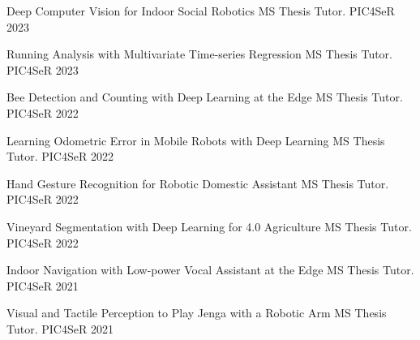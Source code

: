 


\begin{cvhonors}

  \cvhonor
    {Deep Computer Vision for Indoor Social Robotics} %
    {MS Thesis Tutor.} %
    {PIC4SeR} %
    {2023} %

  \cvhonor
    {Running Analysis with Multivariate Time-series Regression}
    {MS Thesis Tutor.} %
    {PIC4SeR} %
    {2023} %

  \cvhonor
    {Bee Detection and Counting with Deep Learning at the Edge} %
    {MS Thesis Tutor.} %
    {PIC4SeR} %
    {2022} %

  \cvhonor
    {Learning Odometric Error in Mobile Robots with Deep Learning}
    {MS Thesis Tutor.} %
    {PIC4SeR} %
    {2022} %

  \cvhonor
    {Hand Gesture Recognition for Robotic Domestic Assistant}
    {MS Thesis Tutor.} %
    {PIC4SeR} %
    {2022} %

  \cvhonor
    {Vineyard Segmentation with Deep Learning for 4.0 Agriculture} %
    {MS Thesis Tutor.} %
    {PIC4SeR} %
    {2022} %
    
  \cvhonor
    {Indoor Navigation with Low-power Vocal Assistant at the Edge} %
    {MS Thesis Tutor.} %
    {PIC4SeR} %
    {2021} %

  \cvhonor
    {Visual and Tactile Perception to Play Jenga with a Robotic Arm} %
    {MS Thesis Tutor.} %
    {PIC4SeR} %
    {2021} %
    

\end{cvhonors}
